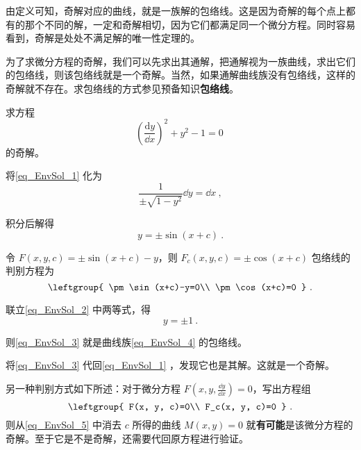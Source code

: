 由定义可知，奇解对应的曲线，就是一族解的包络线。这是因为奇解的每个点上都有的那个不同的解，一定和奇解相切，因为它们都满足同一个微分方程。同时容易看到，奇解是处处不满足解的唯一性定理的。

为了求微分方程的奇解，我们可以先求出其通解，把通解视为一族曲线，求出它们的包络线，则该包络线就是一个奇解。当然，如果通解曲线族没有包络线，这样的奇解就不存在。求包络线的方式参见预备知识\textbf{包络线}。

\begin{example}{}
求方程
\begin{equation}\label{eq_EnvSol_1}
(\frac{\mathrm{d} y}{\dd x})^2+y^2-1=0~
\end{equation}
的奇解。

将\autoref{eq_EnvSol_1} 化为
\begin{equation}
\frac{1}{\pm\sqrt{1-y^2}}\dd y=\dd x~,
\end{equation}

积分后解得
\begin{equation}\label{eq_EnvSol_4}
y=\pm\sin(x+c)~.
\end{equation}

令 $F(x, y, c)=\pm\sin(x+c)-y$，则 $F_c(x, y, c)=\pm\cos(x+c)$ 包络线的判别方程为
\begin{equation}\label{eq_EnvSol_2}
\leftgroup{
    \pm\sin(x+c)-y=0\\
    \pm\cos(x+c)=0
}~.
\end{equation}

联立\autoref{eq_EnvSol_2} 中两等式，得
\begin{equation}\label{eq_EnvSol_3}
y=\pm 1~.
\end{equation}

则\autoref{eq_EnvSol_3} 就是曲线族\autoref{eq_EnvSol_4} 的包络线。

将\autoref{eq_EnvSol_3} 代回\autoref{eq_EnvSol_1} ，发现它也是其解。这就是一个奇解。


\end{example}

另一种判别方式如下所述：对于微分方程 $F(x, y, \frac{\dd y}{\dd x})=0$，写出方程组
\begin{equation}\label{eq_EnvSol_5}
\leftgroup{
    F(x, y, c)=0\\
    F_c(x, y, c)=0
}~.
\end{equation}
则从\autoref{eq_EnvSol_5} 中消去 $c$ 所得的曲线 $M(x, y)=0$ 就\textbf{有可能}是该微分方程的奇解。至于它是不是奇解，还需要代回原方程进行验证。


